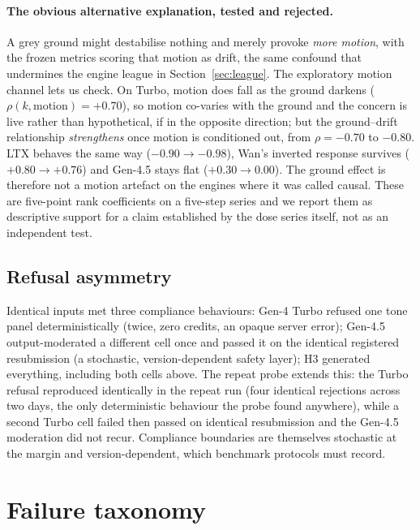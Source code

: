 \documentclass[11pt]{article}
\begin{document}
\paragraph{The obvious alternative explanation, tested and rejected.} A grey
ground might destabilise nothing and merely provoke \emph{more motion}, with
the frozen metrics scoring that motion as drift, the same confound that
undermines the engine league in Section~\ref{sec:league}. The exploratory motion
channel lets us check. On Turbo, motion does fall as the ground darkens
($\rho(k, \text{motion}) = +0.70$), so motion co-varies with the ground and the
concern is live rather than hypothetical, if in the opposite direction; but the ground--drift relationship \emph{strengthens} once motion
is conditioned out, from $\rho = -0.70$ to $-0.80$. LTX behaves the same way
($-0.90 \rightarrow -0.98$), Wan's inverted response survives
($+0.80 \rightarrow +0.76$) and Gen-4.5 stays flat ($+0.30 \rightarrow 0.00$).
The ground effect is therefore not a motion artefact on the engines where it
was called causal. These are five-point rank coefficients on a five-step
series and we report them as descriptive support for a claim established by
the dose series itself, not as an independent test.

\subsection{Refusal asymmetry}

Identical inputs met three compliance behaviours: Gen-4 Turbo refused one
tone panel deterministically (twice, zero credits, an opaque server error);
Gen-4.5 output-moderated a different cell once and
passed it on the identical registered resubmission (a stochastic,
version-dependent safety layer); H3 generated everything, including both
cells above. The repeat probe extends this: the Turbo refusal reproduced
identically in the repeat run (four identical rejections across two days,
the only deterministic behaviour the probe found anywhere), while a second
Turbo cell failed then passed on identical resubmission and the Gen-4.5
moderation did not recur. Compliance boundaries are themselves stochastic at the margin
and version-dependent, which benchmark protocols must record.

\section{Failure taxonomy}
\label{sec:taxonomy}
\end{document}
